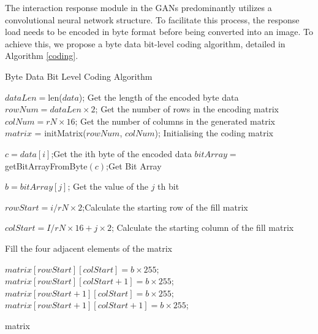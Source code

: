 \documentclass[journal]{IEEEtai}
\begin{document}
The interaction response module in the GANs predominantly utilizes a convolutional neural network structure. 
To facilitate this process, the response load needs to be encoded in byte format before being converted into an image. 
To achieve this, we propose a byte data bit-level coding algorithm, detailed in Algorithm \ref{coding}.


\begin{algorithm}[!h]
	\small
	\caption{Byte Data Bit Level Coding Algorithm}
	\label{coding}
	
	$dataLen = $len($data$);  {\tcp*[h] Get the length of the encoded byte data}\\
	$rowNum = dataLen \times 2$; {\tcp*[h] Get the number of rows in the encoding matrix}\\
	$colNum = rN \times 16$; {\tcp*[h] Get the number of columns in the generated matrix}\\
	$matrix$ = initMatrix($rowNum$, $colNum$); {\tcp*[h]Initialising the coding matrix}\\
	
	{
		$c = data[i]$;{\tcp*[h] Get the ith byte of the encoded data} 
		$bitArray = $getBitArrayFromByte$(c)$;{\tcp*[h] Get Bit Array}\\
		{
			$b = bitArray[j]$; {\tcp*[h] Get the value of the $j$ th bit}
			
			$rowStart = i / rN \times 2$;{\tcp*[h] Calculate the starting row of the fill matrix}
			
			$colStart = I / rN \times 16 + j \times 2$; {\tcp*[h] Calculate the starting column of the fill matrix}
			
			{\tcp*[h] Fill the four adjacent elements of the matrix}
			
			$matrix[rowStart][colStart] = b \times 255$;\\
			$matrix[rowStart][colStart + 1] = b \times 255$;\\
			$matrix[rowStart + 1][colStart] = b \times 255$;\\
			$matrix[rowStart + 1][colStart + 1] = b \times 255$;\\
		}
	}
	\Return matrix
\end{algorithm}
\end{document}
